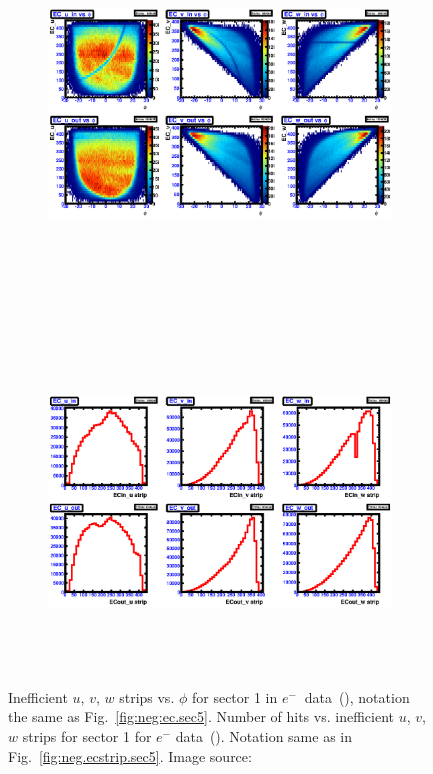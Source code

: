 \begin{figure}[!ht]
  \centering
  \begin{subfigure}[b]{\figwidth}
  \includegraphics[width=\figwidth, height=3.5in,valign=c]{figures/calib/ec/pim_ecuvw_phi_NOKnockout_sec1.eps}\caption{}\label{fig:EC_I_I}
  \end{subfigure}%
  \\
  \begin{subfigure}[b]{\figwidth}
  \includegraphics[width=\figwidth, height=3.5in,valign=c]{figures/calib/ec/pim_ecuvw_NOKnockout_sec1.eps}\caption{}\label{fig:EC_II_I}
  \end{subfigure}%
      \caption {Inefficient  $u$, $v$, $w$ strips vs. $\phi$ for sector 1 in  $e^{-} \ $ data~(), notation the same as Fig.~\ref{fig:neg:ec.sec5}. Number of hits vs. inefficient  $u$, $v$, $w$ strips for sector 1 for $e^-$ data~(). Notation same as in Fig.~\ref{fig:neg.ecstrip.sec5}. Image source:~\cite{clas.thesis.kunkel}}
        \label{fig:EC_no_I}
\end{figure}



